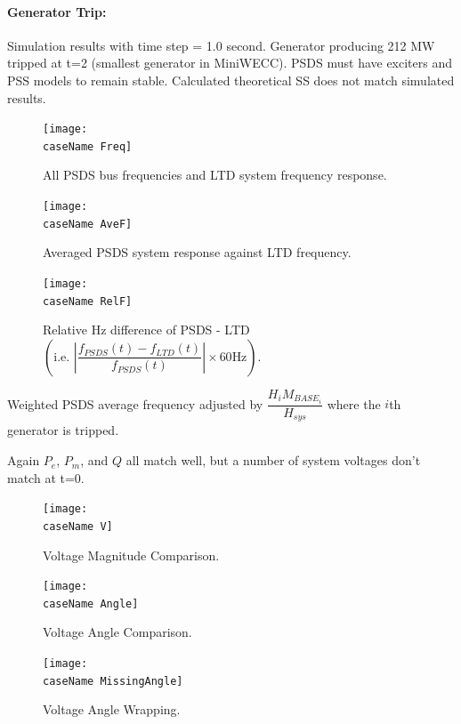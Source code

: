 \documentclass[12pt]{article}
\begin{document}
\paragraph{Generator Trip:} Simulation results with time step = 1.0 second. Generator producing 212 MW tripped at t=2 (smallest generator in MiniWECC). PSDS must have exciters and PSS models to remain stable. Calculated theoretical SS does not match simulated results.

\newcommand{\caseName}{miniWECCgenTrip0}
	\begin{figure}[h!]
			\centering
			\texttt{[image: \\caseName Freq]}\vspace{-1em}
			\caption{All PSDS bus frequencies and LTD system frequency response.}
			\label{fcomp}		 
	\end{figure}\vspace{-2em}


	\begin{figure}[h!]
				\centering
				\texttt{[image: \\caseName AveF]}  \vspace{-2em}
				\caption{Averaged PSDS system response against LTD frequency.} 
				\label{aveF}
	\end{figure}\vspace{-2em}
	\begin{figure}[h!]	
				\centering
				\texttt{[image: \\caseName RelF]}  \vspace{-1.5em}
				\caption{Relative Hz difference of PSDS - LTD $\left( \text{i.e. }  \left|\dfrac{f_{PSDS}(t)- f_{LTD}(t)}{f_{PSDS}(t)}\right| \times 60 \text{Hz} \right)$.}
				\label{redDif}
	\end{figure}
Weighted PSDS average frequency adjusted by $\dfrac{H_i M_{BASE_i}}{H_{sys}}$ where the $i$th generator is tripped.

\pagebreak

Again $P_e$, $P_m$, and $Q$ all match well, but a number of system voltages don't match at t=0.

	\begin{figure}[h!]
			\centering
			\texttt{[image: \\caseName V]}\vspace{-1em}
			\caption{Voltage Magnitude Comparison.}
			\label{vMag}		 
	\end{figure}\vspace{-2em}
	\begin{figure}[h!]
				\centering
				\texttt{[image: \\caseName Angle]}  \vspace{-2em}
				\caption{Voltage Angle Comparison.} 
				\label{vAng}
	\end{figure}\vspace{-2em}
	\begin{figure}[h!]
				\centering
				\texttt{[image: \\caseName MissingAngle]}  \vspace{-2em}
				\caption{Voltage Angle Wrapping.} 
				\label{vAng}
	\end{figure}\vspace{-2em}
\end{document}
